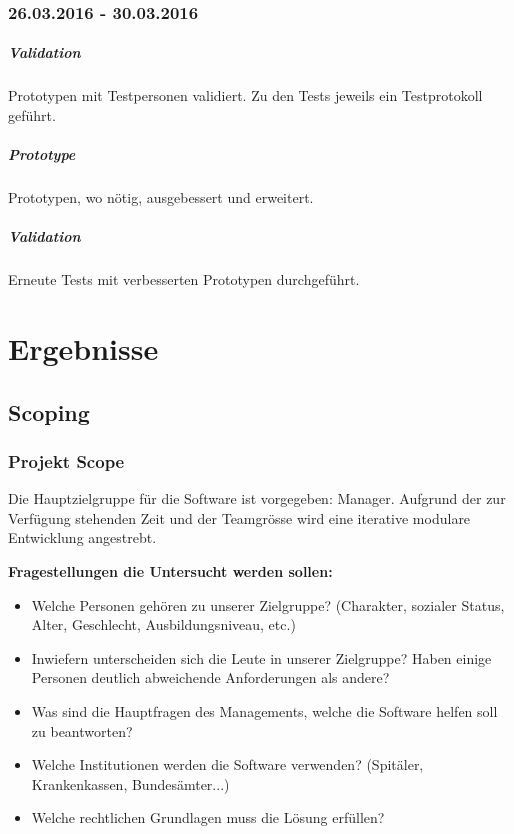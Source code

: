 \documentclass[a4paper]{scrreprt}
\begin{document}
\subsection*{26.03.2016 - 30.03.2016}
\paragraph{Validation}
Prototypen mit Testpersonen validiert. Zu den Tests jeweils ein Testprotokoll geführt.


\paragraph{Prototype}
Prototypen, wo nötig, ausgebessert und erweitert.


\paragraph{Validation}
Erneute Tests mit verbesserten Prototypen durchgeführt.



\chapter{Ergebnisse}
\section{Scoping}

\subsection{Projekt Scope}
Die Hauptzielgruppe für die Software ist vorgegeben: Manager. Aufgrund der zur Verfügung stehenden Zeit
und der Teamgrösse wird eine iterative modulare Entwicklung angestrebt.

\bigskip


\textbf{Fragestellungen die Untersucht werden sollen:}
\begin{itemize}
\item Welche Personen gehören zu unserer Zielgruppe? (Charakter, sozialer Status, Alter, Geschlecht, Ausbildungsniveau, etc.)
\item Inwiefern unterscheiden sich die Leute in unserer Zielgruppe? Haben einige Personen deutlich abweichende Anforderungen als andere?
\item Was sind die Hauptfragen des Managements, welche die Software helfen soll zu beantworten?
\item Welche Institutionen werden die Software verwenden? (Spitäler, Krankenkassen, Bundesämter...)
\item Welche rechtlichen Grundlagen muss die Lösung erfüllen?
\end{itemize}
\end{document}
